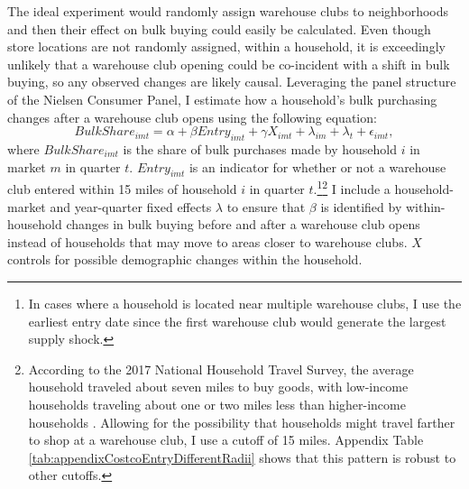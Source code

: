 \documentclass[AER]{AEA_mal}
\begin{document}


The ideal experiment would randomly assign warehouse clubs to neighborhoods and then their effect on bulk buying could easily be calculated. Even though store locations are not randomly assigned, within a household, it is exceedingly unlikely that a warehouse club opening could be co-incident with a shift in bulk buying, so any observed changes are likely causal. Leveraging the panel structure of the Nielsen Consumer Panel, I estimate how a household's bulk purchasing changes after a warehouse club opens using the following equation:
\begin{equation}
\label{eq:costcoEntry}
BulkShare_{imt} = \alpha + \beta Entry_{imt} + \gamma X_{imt} + \lambda_{im} + \lambda_{t} + \epsilon_{imt},
\end{equation}
where $BulkShare_{imt}$ is the share of bulk purchases made by household $i$ in market $m$ in quarter $t$. $Entry_{imt}$ is an indicator for whether or not a warehouse club entered within 15 miles of household $i$ in quarter $t$.\footnote{In cases where a household is located near multiple warehouse clubs, I use the earliest entry date since the first warehouse club would generate the largest supply shock.}\footnote{According to the 2017 National Household Travel Survey, the average household traveled about seven miles to buy goods, with low-income households traveling about one or two miles less than higher-income households \citep{nhts2017}. Allowing for the possibility that households might travel farther to shop at a warehouse club, I use a cutoff of 15 miles. Appendix Table \ref{tab:appendixCostcoEntryDifferentRadii} shows that this pattern is robust to other cutoffs.} I include a household-market and year-quarter fixed effects $\lambda$ to ensure that $\beta$ is identified by within-household changes in bulk buying before and after a warehouse club opens instead of households that may move to areas closer to warehouse clubs. $X$ controls for possible demographic changes within the household.
\end{document}
